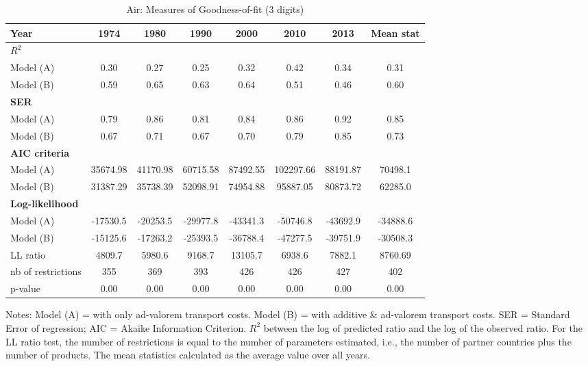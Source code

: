 \documentclass[a4paper,11pt]{article}
\begin{document}
\begin{table}[htbp]
  \centering
  \caption{Air: Measures of Goodness-of-fit (3 digits)}
  \footnotesize{
\begin{center}
    \begin{tabular}{l|cccccc|c}
    \hline \hline
    Year  & 1974  & 1980  & 1990  & 2000  & \multicolumn{1}{c}{2010} & \multicolumn{1}{c}{2013} & Mean stat \\ \hline
    \multicolumn{8}{l}{\bf{$R^2$} }\\ \hline
    Model (A)& 0.30  & 0.27  & 0.25  & 0.32  & \multicolumn{1}{c}{0.42} & \multicolumn{1}{c}{0.34} & 0.31 \\
    Model (B) & 0.59  & 0.65  & 0.63  & 0.64  & \multicolumn{1}{c}{0.51} & \multicolumn{1}{c}{0.46} & 0.60 \\ \hline
    \multicolumn{8}{l}{\textbf{SER}  }  \\ \hline
     Model (A) & 0.79  & 0.86  & 0.81  & 0.84  & \multicolumn{1}{c}{0.86} & \multicolumn{1}{c}{0.92} & 0.85 \\
    Model (B) & 0.67  & 0.71  & 0.67  & 0.70  & \multicolumn{1}{c}{0.79} & \multicolumn{1}{c}{0.85} & 0.73 \\ \hline
   \multicolumn{8}{l}{\textbf{AIC criteria}}  \\ \hline
    Model (A) & 35674.98 & 41170.98 & 60715.58 & 87492.55 & \multicolumn{1}{c}{102297.66} & \multicolumn{1}{c}{88191.87} & 70498.1 \\
    Model (B)  & 31387.29 & 35738.39 & 52098.91 & 74954.88 & \multicolumn{1}{c}{95887.05} & \multicolumn{1}{c}{80873.72} & 62285.0 \\ \hline
    \multicolumn{8}{l}{\textbf{Log-likelihood}} \\ \hline
    Model (A) & -17530.5 & -20253.5 & -29977.8 & -43341.3 & \multicolumn{1}{c}{-50746.8} & \multicolumn{1}{c}{-43692.9} & -34888.6 \\
    Model (B) & -15125.6 & -17263.2 & -25393.5 & -36788.4 & \multicolumn{1}{c}{-47277.5} & \multicolumn{1}{c}{-39751.9} & -30508.3 \\
    LL ratio & 4809.7 & 5980.6 & 9168.7 & 13105.7 & \multicolumn{1}{c}{6938.6} & \multicolumn{1}{c}{7882.1} & 8760.69 \\
    nb of restrictions & 355   & 369   & 393   & 426   & \multicolumn{1}{c}{426} & \multicolumn{1}{c}{427} & 402 \\
    p-value & 0.00 & 0.00 & 0.00 & 0.00 & \multicolumn{1}{c}{0.00} & \multicolumn{1}{c}{0.00} & 0.00 \\
    \hline \hline
 \end{tabular}%
    \end{center}}
  \label{tab:good_fit_air}%
 \parbox[l]{12cm}{\tiny{Notes: Model (A) = with only ad-valorem transport costs. Model (B) = with additive \& ad-valorem transport costs. SER = Standard Error of regression; AIC = Akaike Information Criterion. $R^{2}$ between the log of predicted ratio and the log of the observed ratio. For the LL ratio test, the number of restrictions is equal to the number of parameters estimated, i.e., the number of partner countries plus the number of products. The mean statistics calculated as the average value over all years. }}
\end{table}%
\end{document}
